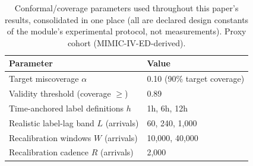 \begin{table}[H]
\centering
\caption{Conformal/coverage parameters used throughout this paper's results, consolidated in one place (all are declared design constants of the module's experimental protocol, not measurements). Proxy cohort (MIMIC-IV-ED-derived).}
\label{tab:parameter-summary}
\begin{tabular}{ll}
\toprule
Parameter & Value \\
\midrule
Target miscoverage $\alpha$ & 0.10 (90\% target coverage) \\
Validity threshold (coverage $\geq$) & 0.89 \\
Time-anchored label definitions $h$ & 1h, 6h, 12h \\
Realistic label-lag band $L$ (arrivals) & 60, 240, 1{,}000 \\
Recalibration windows $W$ (arrivals) & 10{,}000, 40{,}000 \\
Recalibration cadence $R$ (arrivals) & 2{,}000 \\
\bottomrule
\end{tabular}
\end{table}

